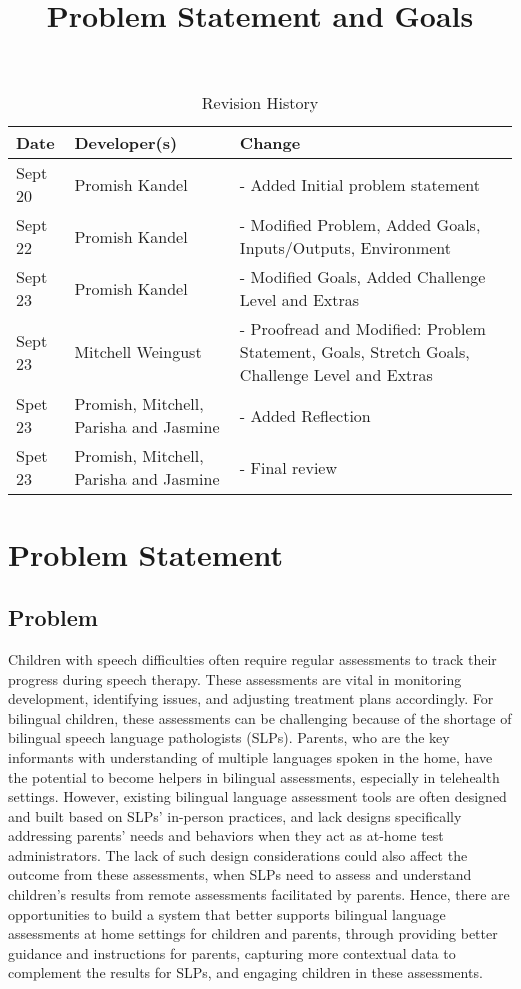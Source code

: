 \documentclass{article}
\title{Problem Statement and Goals\\\progname}
\author{\authname}
\date{}
\begin{document}
\maketitle

\begin{table}[hp]
\caption{Revision History} \label{TblRevisionHistory}
\begin{tabularx}{\textwidth}{llX}
\toprule
\textbf{Date} & \textbf{Developer(s)} & \textbf{Change}\\
\midrule
Sept 20 & Promish Kandel& - Added Initial problem statement\\
Sept 22 & Promish Kandel & - Modified Problem, Added Goals, Inputs/Outputs, Environment\\
Sept 23 & Promish Kandel & - Modified Goals, Added Challenge Level and Extras\\
Sept 23 & Mitchell Weingust & - Proofread and Modified: Problem Statement, Goals, Stretch Goals, Challenge Level and Extras\\
Spet 23 & Promish, Mitchell, Parisha and Jasmine & - Added Reflection\\
Spet 23 & Promish, Mitchell, Parisha and Jasmine & - Final review\\
\bottomrule
\end{tabularx}
\end{table}

\section{Problem Statement}
\subsection{Problem}
\hspace{2em}Children with speech difficulties often require regular assessments to track their progress
during speech therapy. These assessments are vital in monitoring development, identifying issues, and
adjusting treatment plans accordingly. For bilingual children, these assessments can be challenging
because of the shortage of bilingual  speech language pathologists (SLPs).  Parents, who are the key
informants with understanding of multiple languages spoken in the home, have the potential to become
helpers in bilingual assessments, especially in telehealth settings. However, existing bilingual language
assessment tools are often designed and built based on SLPs’ in-person practices, and lack designs
specifically addressing parents’ needs and behaviors when they act as at-home test administrators. The lack of such design
considerations could also affect the outcome from these assessments, when SLPs need to assess and understand
children’s results from remote assessments facilitated by parents. Hence, there are opportunities to build a
system that better supports bilingual language assessments at home settings for children and parents, through
providing better guidance and instructions for parents, capturing more contextual data to complement the
results for SLPs, and engaging children in these assessments.
\end{document}

